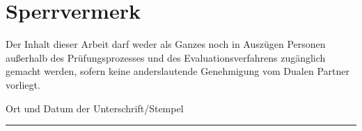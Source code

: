 
\thispagestyle{empty}

\section*{Sperrvermerk}
\vspace*{2em}


Der Inhalt dieser Arbeit darf weder als Ganzes noch in Auszügen Personen außerhalb des Prüfungsprozesses und des 
Evaluationsverfahrens zugänglich gemacht werden, sofern keine anderslautende Genehmigung vom Dualen Partner vorliegt.

\vspace{3em}

{\color{red}Ort und Datum der Unterschrift/Stempel}
\vspace{4em}

\rule{7cm}{0.4pt}\\
